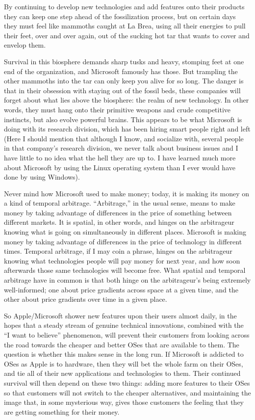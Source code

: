 \documentclass[
  fontsize=11pt,
  paper=landscape,
  twocolumn=true,
  pagesize=pdftex,
  headings=small,
  DIV=15,
  ]{scrartcl}
\begin{document}
By continuing to develop new technologies and add features onto their
products they can keep one step ahead of the fossilization process, but
on certain days they must feel like mammoths caught at La Brea, using
all their energies to pull their feet, over and over again, out of the
sucking hot tar that wants to cover and envelop them.

Survival in this biosphere demands sharp tusks and heavy, stomping feet
at one end of the organization, and Microsoft famously has those. But
trampling the other mammoths into the tar can only keep you alive for so
long. The danger is that in their obsession with staying out of the
fossil beds, these companies will forget about what lies above the
biosphere: the realm of new technology. In other words, they must hang
onto their primitive weapons and crude competitive instincts, but also
evolve powerful brains. This appears to be what Microsoft is doing with
its research division, which has been hiring smart people right and left
(Here I should mention that although I know, and socialize with, several
people in that company's research division, we never talk about business
issues and I have little to no idea what the hell they are up to. I have
learned much more about Microsoft by using the Linux operating system
than I ever would have done by using Windows).

Never mind how Microsoft used to make money; today, it is making its
money on a kind of temporal arbitrage. ``Arbitrage,'' in the usual
sense, means to make money by taking advantage of differences in the
price of something between different markets. It is spatial, in other
words, and hinges on the arbitrageur knowing what is going on
simultaneously in different places. Microsoft is making money by taking
advantage of differences in the price of technology in different times.
Temporal arbitrage, if I may coin a phrase, hinges on the arbitrageur
knowing what technologies people will pay money for next year, and how
soon afterwards those same technologies will become free. What spatial
and temporal arbitrage have in common is that both hinge on the
arbitrageur's being extremely well-informed; one about price gradients
across space at a given time, and the other about price gradients over
time in a given place.

So Apple/Microsoft shower new features upon their users almost daily, in
the hopes that a steady stream of genuine technical innovations,
combined with the ``I want to believe'' phenomenon, will prevent their
customers from looking across the road towards the cheaper and better
OSes that are available to them. The question is whether this makes
sense in the long run. If Microsoft is addicted to OSes as Apple is to
hardware, then they will bet the whole farm on their OSes, and tie all
of their new applications and technologies to them. Their continued
survival will then depend on these two things: adding more features to
their OSes so that customers will not switch to the cheaper
alternatives, and maintaining the image that, in some mysterious way,
gives those customers the feeling that they are getting something for
their money.
\end{document}
